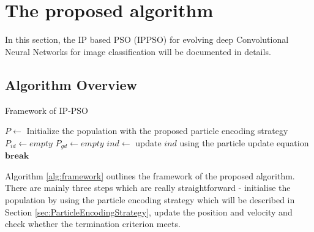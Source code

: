 \documentclass[conference]{IEEEtran}
\begin{document}
%

\section{The proposed algorithm}\label{sec:ProposedAlgorithm}
In this section, the IP based PSO (IPPSO) for evolving deep Convolutional Neural Networks for image classification will be documented in details. 


\subsection{Algorithm Overview}
\begin{algorithm}
	\caption{Framework of IP-PSO}
	\label{alg:framework}
	\begin{algorithmic}
		\renewcommand{\algorithmicrequire}{\textbf{Input:}}
		\renewcommand{\algorithmicensure}{\textbf{Output:}}
		\STATE $P \leftarrow$ Initialize the population with the proposed particle encoding strategy
		\STATE $P_{id} \leftarrow empty$
		\STATE $P_{gd} \leftarrow empty$
				\STATE $ind \leftarrow$ update $ind$ using the particle update equation
					\STATE $\textbf{break}$
				\ENDIF
			\ENDFOR
		\ENDWHILE		
	\end{algorithmic}
\end{algorithm}

Algorithm \ref{alg:framework} outlines the framework of the proposed algorithm. There are mainly three steps which are really straightforward - initialise the population by using the particle encoding strategy which will be described in Section \ref{sec:ParticleEncodingStrategy}, update the position and velocity and check whether the termination criterion meets.
\end{document}

